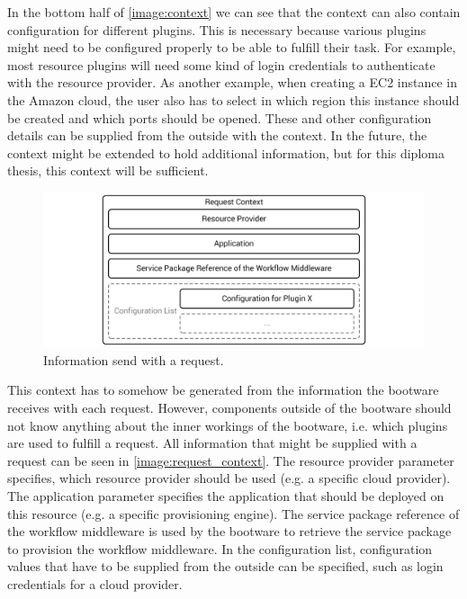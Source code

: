 In the bottom half of \autoref{image:context} we can see that the context can also contain configuration for different plugins.
This is necessary because various plugins might need to be configured properly to be able to fulfill their task.
For example, most resource plugins will need some kind of login credentials to authenticate with the resource provider.
As another example, when creating a EC2 instance in the Amazon cloud, the user also has to select in which region this instance should be created and which ports should be opened.
These and other configuration details can be supplied from the outside with the context.
In the future, the context might be extended to hold additional information, but for this diploma thesis, this context will be sufficient.

\begin{figure}[!htbp]
	\centering
	\includegraphics[resolution=600]{design/assets/request_context}
	\caption{Information send with a request.}
	\label{image:request_context}
\end{figure}

This context has to somehow be generated from the information the bootware receives with each request.
However, components outside of the bootware should not know anything about the inner workings of the bootware, i.e. which plugins are used to fulfill a request.
All information that might be supplied with a request can be seen in \autoref{image:request_context}.
The resource provider parameter specifies, which resource provider should be used (e.g. a specific cloud provider).
The application parameter specifies the application that should be deployed on this resource (e.g. a specific provisioning engine).
The service package reference of the workflow middleware is used by the bootware to retrieve the service package to provision the workflow middleware.
In the configuration list, configuration values that have to be supplied from the outside can be specified, such as login credentials for a cloud provider.


